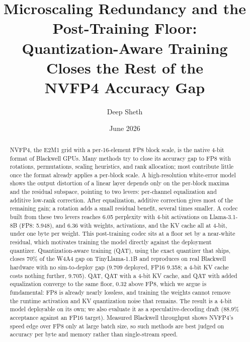 \documentclass[11pt]{article}
\title{Microscaling Redundancy and the Post-Training Floor:\\
Quantization-Aware Training Closes the Rest of the\\
NVFP4 Accuracy Gap}
\author{Deep Sheth}
\date{June 2026}
\begin{document}
\maketitle

\begin{abstract}
NVFP4, the E2M1 grid with a per-16-element FP8 block scale, is the native 4-bit format
of Blackwell GPUs. Many methods try to close its accuracy gap to FP8 with rotations,
permutations, scaling heuristics, and rank allocation; most contribute little once the
format already applies a per-block scale. A high-resolution white-error model shows the
output distortion of a linear layer depends only on the per-block maxima and the
residual subspace, pointing to two levers: per-channel equalization and additive
low-rank correction. After equalization, additive correction gives most of the
remaining gain; a rotation adds a small residual benefit, several times smaller. A codec
built from these two levers reaches 6.05 perplexity with 4-bit activations on
Llama-3.1-8B (FP8: 5.948), and 6.36 with weights, activations, and the KV cache all at
4-bit, under one byte per weight. This post-training codec sits at a floor set by a
near-white residual, which motivates training the model directly against the deployment
quantizer. Quantization-aware training (QAT), using the
exact quantizer that ships, closes 70\% of the W4A4 gap on TinyLlama-1.1B and reproduces
on real Blackwell hardware with no sim-to-deploy gap (9.709 deployed, FP16 9.358; a
4-bit KV cache costs nothing further, 9.705). QAT, QAT with a 4-bit KV cache, and QAT
with added equalization converge to the same floor, 0.32 above FP8, which we argue is
fundamental: FP8 is already nearly lossless, and training the weights cannot remove the
runtime activation and KV quantization noise that remains. The result is a 4-bit model
deployable on its own; we also evaluate it as a speculative-decoding draft (88.9\%
acceptance against an FP16 target). Measured Blackwell throughput shows NVFP4's speed
edge over FP8 only at large batch size, so such methods are best judged on accuracy per
byte and memory rather than single-stream speed.
\end{abstract}
\end{document}
